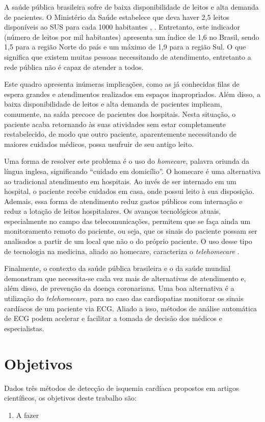 A saúde pública brasileira sofre de baixa disponibilidade de leitos e alta demanda de pacientes. O Ministério da Saúde estabelece que deva haver 2,5 leitos disponíveis ao SUS para cada 1000 habitantes \cite{IBGE2009}, \cite{Brasil2002}. Entretanto, este indicador (número de leitos por mil habitantes) apresenta um índice de 1,6 no Brasil, sendo 1,5 para a região Norte do país e um máximo de 1,9 para a região Sul. O que significa que existem muitas pessoas necessitando de atendimento, entretanto a rede pública não é capaz de atender a todos.

Este quadro apresenta inúmeras implicações, como as já conhecidas filas de espera grandes e atendimentos realizados em espaços inapropriados. Além disso, a baixa disponibilidade de leitos e alta demanda de pacientes implicam, comumente, na saída precoce de pacientes dos hospitais. Nesta situação, o paciente acaba retornando às suas atividades sem estar completamente restabelecido, de modo que outro paciente, aparentemente necessitando de maiores cuidados médicos, possa usufruir de seu antigo leito.

Uma forma de resolver este problema é o uso do \emph{homecare}, palavra oriunda da língua inglesa, significando ``cuidado em domicílio''. O homecare é uma alternativa ao tradicional atendimento em hospitais. Ao invés de ser internado em um hospital, o paciente recebe cuidados em casa, onde possui leito à sua disposição. Ademais, essa forma de atendimento reduz gastos públicos com internação e reduz a lotação de leitos hospitalares. Os avanços tecnológicos atuais, especialmente no campo das telecomunicações, permitem que se faça ainda um monitoramento remoto do paciente, ou seja, que os sinais do paciente possam ser analisados a partir de um local que não o do próprio paciente. O uso desse tipo de tecnologia na medicina, aliado ao homecare, caracteriza o \emph{telehomecare} \cite{Augustyniak2009}.

Finalmente, o contexto da saúde pública brasileira e o da saúde mundial demonstram que necessita-se cada vez mais de alternativas de atendimento e, além disso, de prevenção da doença coronariana. Uma boa alternativa é a utilização do \emph{telehomecare}, para no caso das cardiopatias monitorar os sinais cardíacos de um paciente via ECG. Aliado a isso, métodos de análise automática de ECG podem acelerar e facilitar a tomada de decisão dos médicos e especialistas.


\section{Objetivos}
Dados três métodos de detecção de isquemia cardíaca propostos em artigos científicos, os objetivos deste trabalho são:
\begin{enumerate}
    \item A fazer
\end{enumerate}


